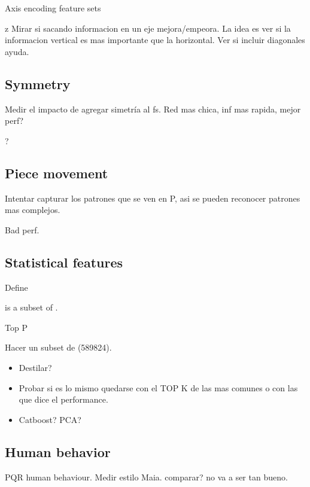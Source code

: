 \begin{table}[H]
\caption{Axis encoding feature sets}
\label{tab:axis_encoding}
\end{table}

\vspace{2cm}

z
Mirar si sacando informacion en un eje mejora/empeora. La idea es ver si la informacion vertical es mas importante que la horizontal. Ver si incluir diagonales ayuda.

\subsection{Symmetry}

Medir el impacto de agregar simetría al fs. Red mas chica, inf mas rapida, mejor perf?

?

\subsection{Piece movement}

Intentar capturar los patrones que se ven en P, asi se pueden reconocer patrones mas complejos.


Bad perf.

\subsection{Statistical features}

Define 

 is a subset of .

Top P

Hacer un subset de  (589824).

\begin{itemize}
\item Destilar?
\item Probar si es lo mismo quedarse con el TOP K de las mas comunes o con las que dice el performance.
\item Catboost? PCA?
\end{itemize}

\subsection{Human behavior}

PQR human behaviour. Medir estilo Maia. comparar? no va a ser tan bueno.




